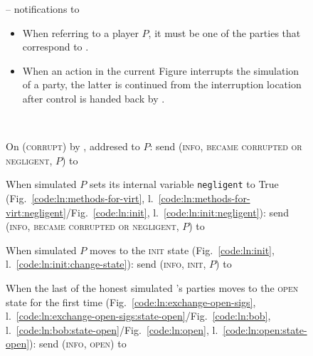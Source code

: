 \begin{figure}[H]
  \begin{simulatorbox}{\simulator{} -- notifications to \fchan}
    \begin{itemize}
      \item When referring to a player $P$, it must be one of the parties that
      correspond to \fchan.
      \item When an action in the current Figure interrupts the simulation of a
      party, the latter is continued from the interruption location after
      control is handed back by \fchan.
    \end{itemize} \ \\
    \begin{algorithmic}[1]
      \State On (\textsc{corrupt}) by \adversary, addresed to $P$:
      \Indent
        \State {}
        \State send (\textsc{info}, \textsc{became corrupted or negligent}, $P$)
        to \fchan
        \label{code:simulator:corrupted}
      \EndIndent
      \Statex

      \State When simulated $P$ sets its internal variable \texttt{negligent} to
      True (Fig.~\ref{code:ln:methods-for-virt},
      l.~\ref{code:ln:methods-for-virt:negligent}/Fig.~\ref{code:ln:init},
      l.~\ref{code:ln:init:negligent}):
      \Indent
        \State send (\textsc{info}, \textsc{became corrupted or negligent}, $P$)
        to \fchan
        \label{code:simulator:negligent}
      \EndIndent
      \Statex

      \State When simulated $P$ moves to the \textsc{init} state
      (Fig.~\ref{code:ln:init}, l.~\ref{code:ln:init:change-state}):
      \Indent
        \State send (\textsc{info}, \textsc{init}, $P$) to \fchan
      \EndIndent
      \Statex

      \State When the last of the honest simulated \fchan's parties moves to the
      \textsc{open} state for the first time
      (Fig.~\ref{code:ln:exchange-open-sigs},
      l.~\ref{code:ln:exchange-open-sigs:state-open}/Fig.~\ref{code:ln:bob},
      l.~\ref{code:ln:bob:state-open}/Fig.~\ref{code:ln:open},
      l.~\ref{code:ln:open:state-open}):
      \Indent
        \State send (\textsc{info}, \textsc{open}) to \fchan
        \label{code:simulator:open}
      \EndIndent
      \Statex


\end{algorithmic}
\end{simulatorbox}
\end{figure}
